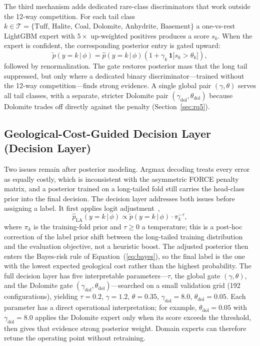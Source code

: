 \documentclass[bdcc,article,submit,pdftex,moreauthors]{Definitions/mdpi}
\begin{document}
The third mechanism adds dedicated rare-class discriminators that work outside the 12-way
competition. For each tail class $k\in\mathcal T=\{\text{Tuff, Halite,
Coal, Dolomite, Anhydrite, Basement}\}$ a one-vs-rest LightGBM expert with $5\times$
up-weighted positives produces a score $s_k$. When the expert is confident, the corresponding
posterior entry is gated upward:
\begin{equation}
\tilde p(y=k\,|\,\phi) = \hat p(y=k\,|\,\phi)\!\left(1+\gamma_k\,\mathbf 1\bigl[s_k>\theta_k\bigr]\right),
\label{eq:gate}
\end{equation}
followed by renormalization. The gate restores posterior mass that the long tail suppressed,
but only where a dedicated binary discriminator---trained without the 12-way
competition---finds strong evidence. A single global pair $(\gamma,\theta)$ serves all tail
classes, with a separate, stricter Dolomite pair $(\gamma_\text{dol},\theta_\text{dol})$
because Dolomite trades off directly against the penalty (Section~\ref{sec:rq5}).

\subsection{Geological-Cost-Guided Decision Layer (Decision Layer)}
\label{sec:decision}
Two issues remain after posterior modeling. Argmax decoding treats every error as equally
costly, which is inconsistent with the asymmetric FORCE penalty matrix, and a posterior trained
on a long-tailed fold still carries the head-class prior into the final decision. The decision
layer addresses both issues before assigning a label. It first applies logit
adjustment~\cite{menon2021logit},
\begin{equation}
\hat p_\text{LA}(y=k\,|\,\phi)\propto \tilde p(y=k\,|\,\phi)\cdot \pi_k^{-\tau},
\label{eq:logitadj}
\end{equation}
where $\pi_k$ is the training-fold prior and $\tau\geq 0$ a temperature; this is a post-hoc
correction of the label prior shift between the long-tailed training distribution and the
evaluation objective, not a heuristic boost. The adjusted posterior then enters the
Bayes-risk rule of Equation~(\ref{eq:bayes}), so the final label is the one with the lowest
expected geological cost rather than the highest probability. The full decision layer has five
interpretable parameters---$\tau$, the global gate $(\gamma,\theta)$, and the Dolomite gate
$(\gamma_\text{dol},\theta_\text{dol})$---searched on a small validation grid (192
configurations), yielding $\tau=0.2$, $\gamma=1.2$, $\theta=0.35$,
$\gamma_\text{dol}=8.0$, $\theta_\text{dol}=0.05$. Each parameter has a direct operational
interpretation; for example, $\theta_\text{dol}=0.05$ with $\gamma_\text{dol}=8.0$ applies the
Dolomite expert only when its score exceeds the threshold, then gives that evidence strong
posterior weight. Domain experts can therefore retune the operating point without retraining.
\end{document}

